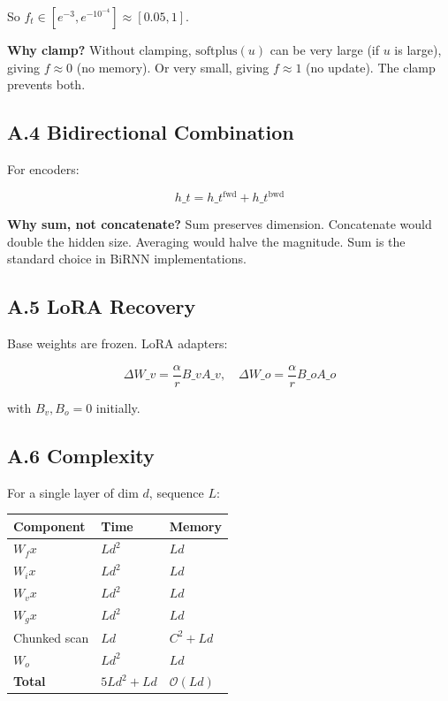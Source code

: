 So $f_t \in [e^{-3}, e^{-10^{-4}}] \approx [0.05, 1]$.

\textbf{Why clamp?} Without clamping, $\text{softplus}(u)$ can be very large (if 
$u$ is large), giving $f \approx 0$ (no memory). Or very small, giving 
$f \approx 1$ (no update). The clamp prevents both.

\subsection{A.4 Bidirectional Combination}

For encoders:

\[
h\_t = h\_t^\text{fwd} + h\_t^\text{bwd}
\tag{A.9}
\]

\textbf{Why sum, not concatenate?} Sum preserves dimension. Concatenate would 
double the hidden size. Averaging would halve the magnitude. Sum is the 
standard choice in BiRNN implementations.

\subsection{A.5 LoRA Recovery}

Base weights are frozen. LoRA adapters:

\[
\Delta W\_v = \frac{\alpha}{r} B\_v A\_v, \quad
\Delta W\_o = \frac{\alpha}{r} B\_o A\_o
\tag{A.10}
\]

with $B_v, B_o = 0$ initially.

\subsection{A.6 Complexity}

For a single layer of dim $d$, sequence $L$:

\begin{table}[H]
\centering
\small
\begin{tabular}{lll}
\toprule
\textbf{Component} & \textbf{Time} & \textbf{Memory} \\
\midrule
$W_f x$ & $L d^2$ & $L d$ \\
$W_i x$ & $L d^2$ & $L d$ \\
$W_v x$ & $L d^2$ & $L d$ \\
$W_g x$ & $L d^2$ & $L d$ \\
Chunked scan & $L d$ & $C^2 + L d$ \\
$W_o$ & $L d^2$ & $L d$ \\
\textbf{Total} & $5 L d^2 + L d$ & $\mathcal{O}(L d)$ \\
\bottomrule
\end{tabular}
\end{table}

